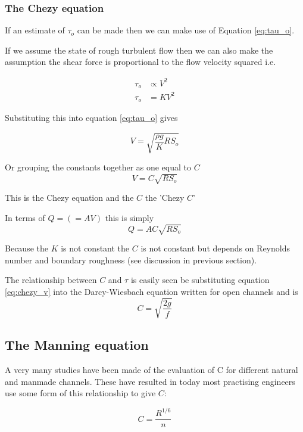 \documentclass[a4paper, 12pt, british]{article} %
\numberwithin{equation}{section}
\numberwithin{figure}{section}
\numberwithin{table}{section}
\begin{document}
\subsubsection{The Chezy equation}

If an estimate of $\tau_o$ can be made then we can make use of Equation \ref{eq:tau_o}.

If we assume the state of rough turbulent flow then we can also make the assumption the shear force is proportional to the flow velocity squared i.e.

 \begin{align*}
\tau_o &\propto V^2 \\
\tau_o &= K V^2
\end{align*}
 

Substituting this into equation \ref{eq:tau_o} gives


\begin{equation}
V = \sqrt{\frac{\rho g}{K}R S_o}
\end{equation} 

Or grouping the constants together as one equal to $C$
\begin{equation}
V = C\sqrt{R S_o}
\label{eq:chezy_v}
\end{equation} 

This is the Chezy equation and the $C$ the 'Chezy $C$'

In terms of $Q = (=AV)$ this is simply
\begin{equation}
Q = AC\sqrt{R S_o}
\label{eq:chezy_q}
\end{equation}

Because the $K$ is not constant the $C$ is not constant but depends on Reynolds number and boundary roughness (see discussion in previous section).

The relationship between $C$ and $\tau$ is easily seen be substituting equation \ref{eq:chezy_v} into the Darcy-Wiesbach equation written for open channels and is
\begin{equation}
C = \sqrt{\frac{2 g}{f}}
\end{equation} 
\subsection{The Manning equation}
A very many studies have been made of the evaluation of C for different natural and manmade channels. These have resulted in today most practising engineers use some form of this relationship to give $C$:

\begin{equation}
C = \frac{R^{1/6}}{n}
\label{eq:chezy_manning}
\end{equation}  
\end{document}
